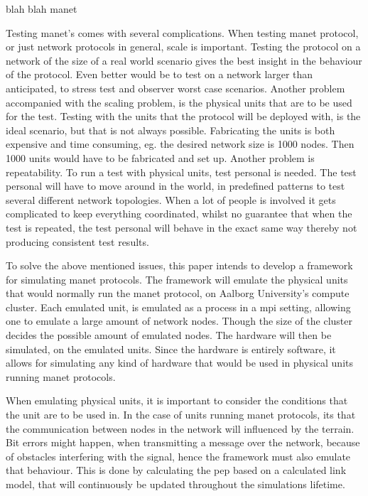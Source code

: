 blah blah \gls{manet}\medbreak


Testing \gls{manet}'s comes with several complications. 
When testing \gls{manet} protocol, or just network protocols in general, scale is important. Testing the protocol on a network of the size of a real world scenario gives the best insight in the behaviour of the protocol. Even better would be to test on a network larger than anticipated, to stress test and observer worst case scenarios.
Another problem accompanied with the scaling problem, is the physical units that are to be used for the test. Testing with the units that the protocol will be deployed with, is the ideal scenario, but that is not always possible. Fabricating the units is both expensive and time consuming, eg. the desired network size is 1000 nodes. Then 1000 units would have to be fabricated and set up.
Another problem is repeatability. To run a test with physical units, test personal is needed. The test personal will have to move around in the world, in predefined patterns to test several different network topologies. When a lot of people is involved it gets complicated to keep everything coordinated, whilst no guarantee that when the test is repeated, the test personal will behave in the exact same way thereby not producing consistent test results.\medbreak

To solve the above mentioned issues, this paper intends to develop a framework for simulating \gls{manet} protocols. The framework will emulate the physical units that would normally run the \gls{manet} protocol, on Aalborg University's compute cluster. Each emulated unit, is emulated as a process in a \gls{mpi} setting, allowing one to emulate a large amount of network nodes. Though the size of the cluster decides the possible amount of emulated nodes. The hardware will then be simulated, on the emulated units. Since the hardware is entirely software, it allows for simulating any kind of hardware that would be used in physical units running \gls{manet} protocols.\medbreak

When emulating physical units, it is important to consider the conditions that the unit are to be used in. In the case of units running \gls{manet} protocols, its that the communication between nodes in the network will influenced by the terrain. Bit errors might happen, when transmitting a message over the network, because of obstacles interfering with the signal, hence the framework must also emulate that behaviour. This is done by calculating the \gls{pep} based on a calculated link model, that will continuously be updated throughout the simulations lifetime.






